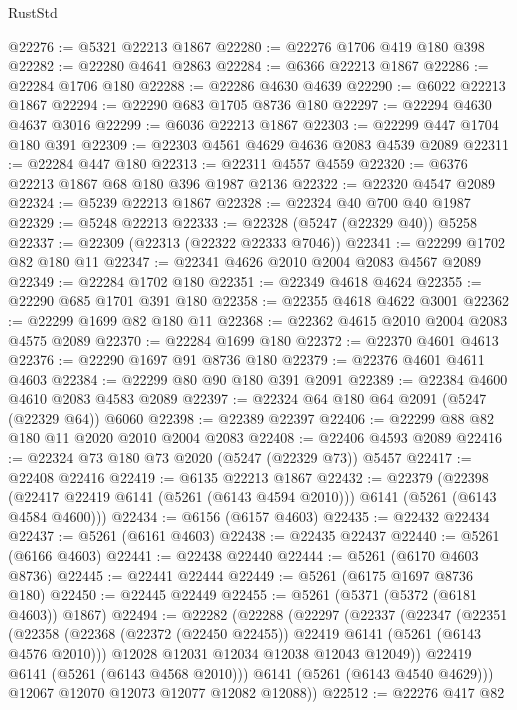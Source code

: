 \begin{lexlean}{RustStd}
\begin{coremodule}
@22276 := @5321 @22213 @1867
@22280 := @22276 @1706 @419 @180 @398
@22282 := @22280 @4641 @2863
@22284 := @6366 @22213 @1867
@22286 := @22284 @1706 @180
@22288 := @22286 @4630 @4639
@22290 := @6022 @22213 @1867
@22294 := @22290 @683 @1705 @8736 @180
@22297 := @22294 @4630 @4637 @3016
@22299 := @6036 @22213 @1867
@22303 := @22299 @447 @1704 @180 @391
@22309 := @22303 @4561 @4629 @4636 @2083 @4539 @2089
@22311 := @22284 @447 @180
@22313 := @22311 @4557 @4559
@22320 := @6376 @22213 @1867 @68 @180 @396 @1987 @2136
@22322 := @22320 @4547 @2089
@22324 := @5239 @22213 @1867
@22328 := @22324 @40 @700 @40 @1987
@22329 := @5248 @22213
@22333 := @22328 (@5247 (@22329 @40)) @5258
@22337 := @22309 (@22313 (@22322 @22333 @7046))
@22341 := @22299 @1702 @82 @180 @11
@22347 := @22341 @4626 @2010 @2004 @2083 @4567 @2089
@22349 := @22284 @1702 @180
@22351 := @22349 @4618 @4624
@22355 := @22290 @685 @1701 @391 @180
@22358 := @22355 @4618 @4622 @3001
@22362 := @22299 @1699 @82 @180 @11
@22368 := @22362 @4615 @2010 @2004 @2083 @4575 @2089
@22370 := @22284 @1699 @180
@22372 := @22370 @4601 @4613
@22376 := @22290 @1697 @91 @8736 @180
@22379 := @22376 @4601 @4611 @4603
@22384 := @22299 @80 @90 @180 @391 @2091
@22389 := @22384 @4600 @4610 @2083 @4583 @2089
@22397 := @22324 @64 @180 @64 @2091 (@5247 (@22329 @64)) @6060
@22398 := @22389 @22397
@22406 := @22299 @88 @82 @180 @11 @2020 @2010 @2004 @2083
@22408 := @22406 @4593 @2089
@22416 := @22324 @73 @180 @73 @2020 (@5247 (@22329 @73)) @5457
@22417 := @22408 @22416
@22419 := @6135 @22213 @1867
@22432 := @22379
    (@22398 (@22417 @22419 @6141 (@5261 (@6143 @4594 @2010))) @6141 (@5261 (@6143 @4584 @4600)))
@22434 := @6156 (@6157 @4603)
@22435 := @22432 @22434
@22437 := @5261 (@6161 @4603)
@22438 := @22435 @22437
@22440 := @5261 (@6166 @4603)
@22441 := @22438 @22440
@22444 := @5261 (@6170 @4603 @8736)
@22445 := @22441 @22444
@22449 := @5261 (@6175 @1697 @8736 @180)
@22450 := @22445 @22449
@22455 := @5261 (@5371 (@5372 (@6181 @4603)) @1867)
@22494 := @22282
    (@22288
      (@22297
        (@22337
          (@22347
            (@22351
              (@22358
                (@22368 (@22372 (@22450 @22455)) @22419 @6141 (@5261 (@6143 @4576 @2010)))
                @12028
                @12031
                @12034
                @12038
                @12043
                @12049))
            @22419
            @6141
            (@5261 (@6143 @4568 @2010)))
          @6141
          (@5261 (@6143 @4540 @4629)))
        @12067
        @12070
        @12073
        @12077
        @12082
        @12088))
@22512 := @22276
    @417
    @82

\end{coremodule}
\end{lexlean}
